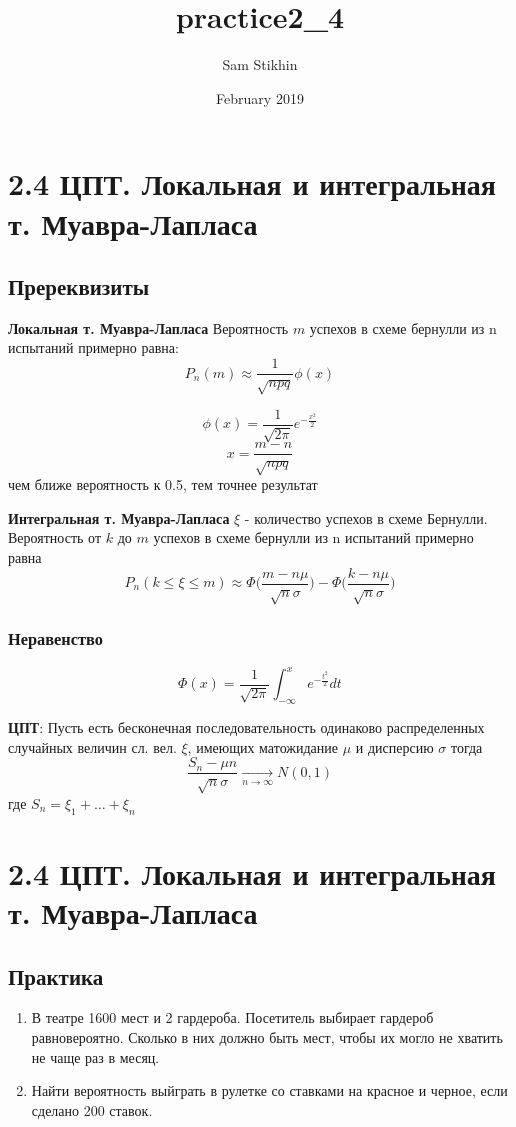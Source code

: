 \documentclass[a4paper, 14pt]{extarticle}
\title{practice2_4}
\author{Sam Stikhin}
\date{February 2019}
\begin{document}
\section*{2.4 ЦПТ. Локальная и интегральная т. Муавра-Лапласа}
\subsection*{Пререквизиты}
\textbf{Локальная т. Муавра-Лапласа} Вероятность $m$ успехов в схеме бернулли из n испытаний примерно равна:
$$P_n(m)  \approx \frac{1}{\sqrt{npq}} \phi(x)$$

$$\phi(x) = \frac{1}{\sqrt{2\pi}}e^{-\frac{x^2}{2}}$$
$$x = \frac{m - n}{\sqrt{npq}}$$
чем ближе вероятность к 0.5, тем точнее результат 


\textbf{Интегральная т. Муавра-Лапласа}
$\xi$ - количество успехов в схеме Бернулли. Вероятность от $k$ до $m$ успехов в схеме бернулли из n испытаний примерно равна
$$P_n(k\leq \xi \leq m)  \approx  \Phi\Big(\frac{m-n\mu}{\sqrt{n}\sigma}\Big) - \Phi\Big(\frac{k-n\mu}{\sqrt{n}\sigma}\Big)$$

\subsubsection{Неравенство}
$$\Phi(x) = \frac{1}{\sqrt{2\pi}}\int_{-\infty}^{x}e^{-\frac{t^2}{2}}dt$$

\textbf{ЦПТ}: Пусть есть бесконечная последовательность одинаково распределенных случайных величин сл. вел. $\xi$, имеющих матожидание $\mu$ и дисперсию $\sigma$ тогда
$$\frac{S_n - \mu n}{\sqrt{n}\sigma} \underset{n \to \infty}{\to} N(0,1)$$
где $S_n = \xi_1 + \ldots + \xi_n$

\newpage
\section*{2.4 ЦПТ. Локальная и интегральная т. Муавра-Лапласа}
\subsection*{Практика}
\begin{enumerate}
\item В театре 1600 мест и 2 гардероба. Посетитель выбирает гардероб равновероятно. Сколько в них должно быть мест, чтобы их могло не хватить не чаще раз в месяц.
\item Найти вероятность выйграть в рулетке со ставками на красное и черное, если сделано 200 ставок.

\end{enumerate}
\newpage
\end{document}
